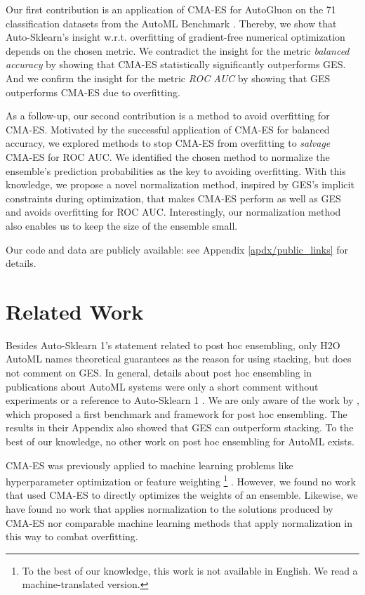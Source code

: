 \documentclass[11pt]{article}
\begin{document}
Our first contribution is an application of CMA-ES for AutoGluon on the 71 classification datasets from the AutoML Benchmark \citep{automl_benchmark_2022}.
Thereby, we show that Auto-Sklearn's insight w.r.t.{} overfitting of gradient-free numerical optimization depends on the chosen metric. 
We contradict the insight for the metric \emph{balanced accuracy} by showing that CMA-ES statistically significantly outperforms GES.
And we confirm the insight for the metric \emph{ROC AUC} by showing that GES outperforms CMA-ES due to overfitting.  

As a follow-up, our second contribution is a method to avoid overfitting for CMA-ES. 
Motivated by the successful application of CMA-ES for balanced accuracy, we explored methods to stop CMA-ES from overfitting to \emph{salvage} CMA-ES for ROC AUC.  
We identified the chosen method to normalize the ensemble's prediction probabilities as the key to avoiding overfitting. 
With this knowledge, we propose a novel normalization method, inspired by GES's implicit constraints during optimization, that makes CMA-ES perform as well as GES and avoids overfitting for ROC AUC. 
Interestingly, our normalization method also enables us to keep the size of the ensemble small. 


Our code and data are publicly available: see Appendix \ref{apdx/public_links} for details. 
\section{Related Work}
Besides Auto-Sklearn 1's \citep{ask1} statement related to post hoc ensembling, only H2O AutoML names theoretical guarantees \citep{vanderLaanPolleyHubbard+2007} as the reason for using stacking, but does not comment on GES.
In general, details about post hoc ensembling in publications about AutoML systems were only a short comment without experiments or a reference to Auto-Sklearn 1 \citep{ask1, apt1, ag1, H2OAutoML20}. 
We are only aware of the work by \cite{purucker2022assembledopenml}, which proposed a first benchmark and framework for post hoc ensembling. 
The results in their Appendix also showed that GES can outperform stacking. 
To the best of our knowledge, no other work on post hoc ensembling for AutoML exists. 

CMA-ES was previously applied to machine learning problems like hyperparameter optimization \citep{DBLP:conf/aaai/NomuraWAOO21, DBLP:journals/corr/LoshchilovH16} or feature weighting \citep{DBLP:conf/siu/TasciGU18}\footnote{To the best of our knowledge, this work is not available in English. We read a machine-translated version.}
.
However, we found no work that used CMA-ES to directly optimizes the weights of an ensemble. 
Likewise, we have found no work that applies normalization to the solutions produced by CMA-ES nor comparable machine learning methods that apply normalization in this way to combat overfitting.  
\end{document}
